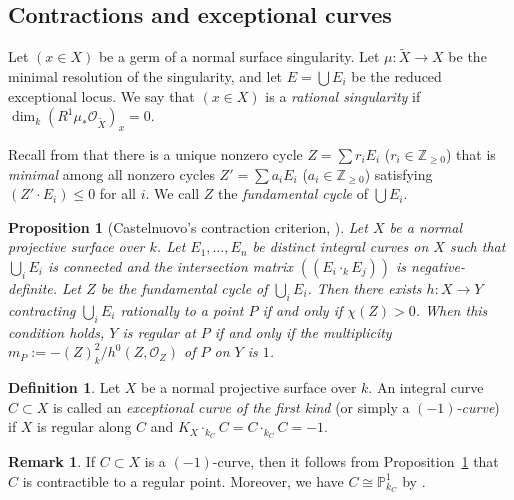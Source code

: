 \documentclass[reqno,oneside]{amsart}
\newtheorem{proposition}[theorem]{Proposition}
\theoremstyle{definition}
\newtheorem{definition}[theorem]{Definition}
\newtheorem{remark}[theorem]{Remark}
\theoremstyle{plain}
\numberwithin{equation}{section}
\begin{document}
\subsection{Contractions and exceptional curves}\label{subsection-contractions}
Let $(x\in X)$ be a germ of a normal surface singularity.
Let $\mu\colon \widetilde{X}\to X$ be the minimal resolution of the singularity, and let $E = \bigcup E_i$ be the reduced exceptional locus.
We say that $(x\in X)$ is a {\it rational singularity} if $\dim_k (R^1\mu_* \mathcal{O}_{\widetilde{X}})_x = 0$.

Recall from \cite[pp.~131--132]{Artin66Rat} that there is a unique nonzero cycle $Z =\sum r_i E_i$ ($r_i\in \mathbb Z_{\ge0}$) that is {\it minimal} among all nonzero cycles $Z'=\sum a_i E_i$ ($a_i\in \mathbb Z_{\ge 0}$) satisfying $(Z'\cdot E_i) \le 0$ for all $i$.
We call $Z$ the {\it fundamental cycle} of $\bigcup E_i$.

\begin{proposition}[Castelnuovo's contraction criterion, {\cite[Theorem~27.1]{Lipman69}}]\label{proposition-cont}
  Let $X$ be a normal projective surface over $k$.
  Let $E_1,\ldots,E_n$ be distinct integral curves on $X$ such that $\bigcup_i E_i$ is connected and the intersection matrix $((E_i\cdot_k E_j))$ is negative-definite.
  Let $Z$ be the fundamental cycle of $\bigcup_i E_i$.
  Then there exists $h\colon X\to Y$ contracting $\bigcup_i E_i$ rationally to a point $P$ if and only if $\chi(Z) > 0$.
  When this condition holds, $Y$ is regular at $P$ if and only if the \emph{multiplicity} $m_P := - (Z)^2_k/ h^0(Z,\mathcal{O}_Z)$ of $P$ on $Y$ is $1$.
\end{proposition}

\begin{definition}\label{definition-exceptional-curve-first-kind}
  Let $X$ be a normal projective surface over $k$.
  An integral curve $C \subset X$ is called an {\it exceptional curve of the first kind} (or simply a {\it $(-1)$-curve}) if $X$ is regular along $C$ and $K_X \cdot_{k_C} C = C\cdot_{k_C} C = -1$.
\end{definition}

\begin{remark}\label{remark-exceptional-curve-first-kind}
  If $C\subset X$ is a $(-1)$-curve, then it follows from Proposition~\ref{proposition-cont} that $C$ is contractible to a regular point.
  Moreover, we have $C \cong \mathbb P^1_{k_C}$ by \cite[Lemma~10.8 (4)]{Kollar-Sing}.
\end{remark}
\end{document}
